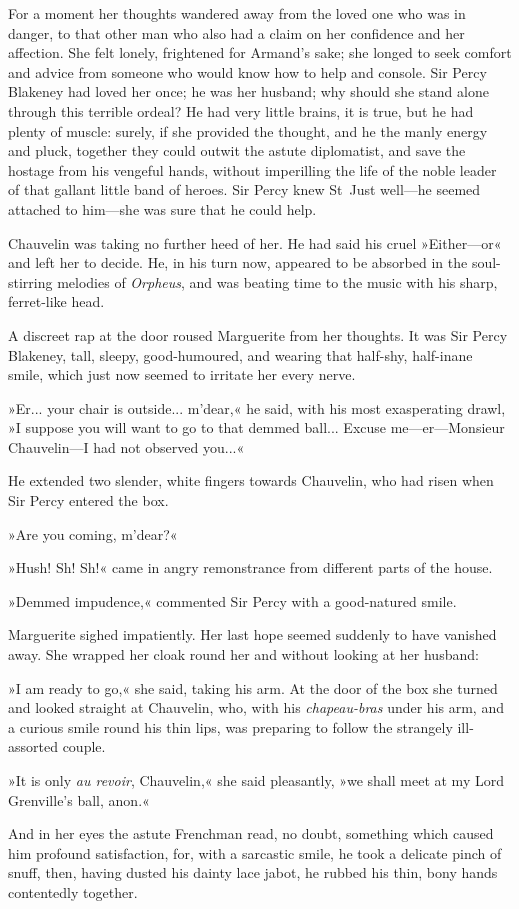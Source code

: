 For a moment her thoughts wandered away from the loved one who was in danger, to that other man who also had a claim on her confidence and her affection. She felt lonely, frightened for Armand's sake; she longed to seek comfort and advice from someone who would know how to help and console. Sir Percy Blakeney had loved her once; he was her husband; why should she stand alone through this terrible ordeal? He had very little brains, it is true, but he had plenty of muscle: surely, if she provided the thought, and he the manly energy and pluck, together they could outwit the astute diplomatist, and save the hostage from his vengeful hands, without imperilling the life of the noble leader of that gallant little band of heroes. Sir Percy knew St~Just well\allowbreak---\allowbreak he seemed attached to him\allowbreak---\allowbreak she was sure that he could help.

Chauvelin was taking no further heed of her. He had said his cruel »Either\allowbreak---\allowbreak or\longdash« and left her to decide. He, in his turn now, appeared to be absorbed in the soul-stirring melodies of \textit{Orpheus}, and was beating time to the music with his sharp, ferret-like head.

A discreet rap at the door roused Marguerite from her thoughts. It was Sir Percy Blakeney, tall, sleepy, good-humoured, and wearing that half-shy, half-inane smile, which just now seemed to irritate her every nerve.

»Er... your chair is outside... m'dear,« he said, with his most exasperating drawl, »I suppose you will want to go to that demmed ball... Excuse me\allowbreak---\allowbreak er\allowbreak---\allowbreak Monsieur Chauvelin\allowbreak---\allowbreak I had not observed you...«

He extended two slender, white fingers towards Chauvelin, who had risen when Sir Percy entered the box.

»Are you coming, m'dear?«

»Hush! Sh! Sh!« came in angry remonstrance from different parts of the house.

»Demmed impudence,« commented Sir Percy with a good-natured smile.

Marguerite sighed impatiently. Her last hope seemed suddenly to have vanished away. She wrapped her cloak round her and without looking at her husband:

»I am ready to go,« she said, taking his arm. At the door of the box she turned and looked straight at Chauvelin, who, with his \textit{chapeau-bras} under his arm, and a curious smile round his thin lips, was preparing to follow the strangely ill-assorted couple.

»It is only \textit{au revoir}, Chauvelin,« she said pleasantly, »we shall meet at my Lord Grenville's ball, anon.«

And in her eyes the astute Frenchman read, no doubt, something which caused him profound satisfaction, for, with a sarcastic smile, he took a delicate pinch of snuff, then, having dusted his dainty lace jabot, he rubbed his thin, bony hands contentedly together.